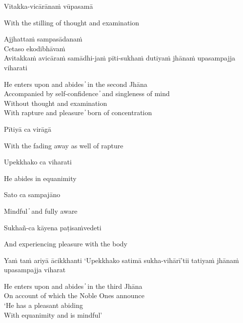 Vitakka-vicārānaṁ vūpasamā

\begin{cprenglish}
  With the stilling of thought and examination
\end{cprenglish}

Ajjhattaṁ sampasādanaṁ\\
Cetaso ekodibhāvaṁ\\
Avitakkaṁ avicāraṁ samādhi-jaṁ pīti-sukhaṁ dutiyaṁ jhānaṁ upasampajja viharati

\begin{cprenglish}
  He enters upon and abides  ̓  in the second Jhāna\\
  Accompanied by self-confidence  ̓  and singleness of mind\\
  Without thought and examination\\
  With rapture and pleasure  ̓  born of concentration
\end{cprenglish}

Pītiyā ca virāgā

\begin{cprenglish}
  With the fading away as well of rapture
\end{cprenglish}

Upekkhako ca viharati

\begin{cprenglish}
  He abides in equanimity
\end{cprenglish}

Sato ca sampajāno

\begin{cprenglish}
  Mindful  ̓  and fully aware
\end{cprenglish}

Sukhañ-ca kāyena paṭisaṁvedeti

\begin{cprenglish}
  And experiencing pleasure with the body
\end{cprenglish}

Yaṁ taṁ ariyā ācikkhanti
‘Upekkhako satimā sukha-vihārī’tii tatiyaṁ jhānaṁ upasampajja viharat

\begin{cprenglish}
  He enters upon and abides  ̓  in the third Jhāna\\
  On account of which the Noble Ones announce\\
  ‘He has a pleasant abiding\\
  With equanimity and is mindful’
\end{cprenglish}

